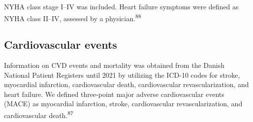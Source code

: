 \documentclass[
  letterpaper,
  headsepline=true,
  open=any]{scrbook}
\begin{document}
NYHA class stage I--IV was included. Heart failure symptoms were defined
as NYHA class II--IV, assessed by a physician.\textsuperscript{88}

\hypertarget{cardiovascular-events}{%
\subsection{Cardiovascular events}\label{cardiovascular-events}}

Information on CVD events and mortality was obtained from the Danish
National Patient Registers until 2021 by utilizing the ICD-10 codes for
stroke, myocardial infarction, cardiovascular death, cardiovascular
revascularization, and heart failure. We defined three-point major
adverse cardiovascular events (MACE) as myocardial infarction, stroke,
cardiovascular revascularization, and cardiovascular
death.\textsuperscript{87}
\end{document}
